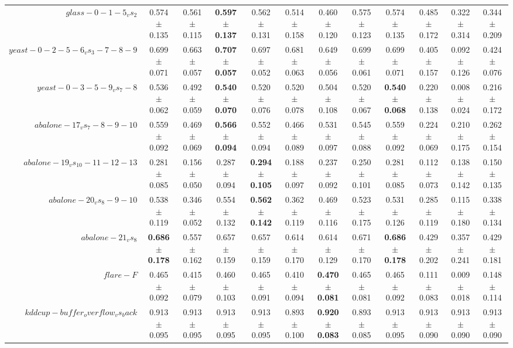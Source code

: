 \begin{table}[!ht]
{\begin{tabular}{r c c c c c c c c c c c}
$glass-0-1-5_vs_2$ & 0.574 $\pm$ 0.135 & 0.561 $\pm$ 0.115 & \textbf{0.597 $\pm$ 0.137} & 0.562 $\pm$ 0.131 & 0.514 $\pm$ 0.158 & 0.460 $\pm$ 0.120 & 0.575 $\pm$ 0.123 & 0.574 $\pm$ 0.135 & 0.485 $\pm$ 0.172 & 0.322 $\pm$ 0.314 & 0.344 $\pm$ 0.209 \\
$yeast-0-2-5-6_vs_3-7-8-9$ & 0.699 $\pm$ 0.071 & 0.663 $\pm$ 0.057 & \textbf{0.707 $\pm$ 0.057} & 0.697 $\pm$ 0.052 & 0.681 $\pm$ 0.063 & 0.649 $\pm$ 0.056 & 0.699 $\pm$ 0.061 & 0.699 $\pm$ 0.071 & 0.405 $\pm$ 0.157 & 0.092 $\pm$ 0.126 & 0.424 $\pm$ 0.076 \\
$yeast-0-3-5-9_vs_7-8$ & 0.536 $\pm$ 0.062 & 0.492 $\pm$ 0.059 & \textbf{0.540 $\pm$ 0.070} & 0.520 $\pm$ 0.076 & 0.520 $\pm$ 0.078 & 0.504 $\pm$ 0.108 & 0.520 $\pm$ 0.067 & \textbf{0.540 $\pm$ 0.068} & 0.220 $\pm$ 0.138 & 0.008 $\pm$ 0.024 & 0.216 $\pm$ 0.172 \\
$abalone-17_vs_7-8-9-10$ & 0.559 $\pm$ 0.092 & 0.469 $\pm$ 0.069 & \textbf{0.566 $\pm$ 0.094} & 0.552 $\pm$ 0.094 & 0.466 $\pm$ 0.089 & 0.531 $\pm$ 0.097 & 0.545 $\pm$ 0.088 & 0.559 $\pm$ 0.092 & 0.224 $\pm$ 0.069 & 0.210 $\pm$ 0.175 & 0.262 $\pm$ 0.154 \\
$abalone-19_vs_10-11-12-13$ & 0.281 $\pm$ 0.085 & 0.156 $\pm$ 0.050 & 0.287 $\pm$ 0.094 & \textbf{0.294 $\pm$ 0.105} & 0.188 $\pm$ 0.097 & 0.237 $\pm$ 0.092 & 0.250 $\pm$ 0.101 & 0.281 $\pm$ 0.085 & 0.112 $\pm$ 0.073 & 0.138 $\pm$ 0.142 & 0.150 $\pm$ 0.135 \\
$abalone-20_vs_8-9-10$ & 0.538 $\pm$ 0.119 & 0.346 $\pm$ 0.052 & 0.554 $\pm$ 0.132 & \textbf{0.562 $\pm$ 0.142} & 0.362 $\pm$ 0.119 & 0.469 $\pm$ 0.116 & 0.523 $\pm$ 0.175 & 0.531 $\pm$ 0.126 & 0.285 $\pm$ 0.119 & 0.115 $\pm$ 0.180 & 0.338 $\pm$ 0.134 \\
$abalone-21_vs_8$ & \textbf{0.686 $\pm$ 0.178} & 0.557 $\pm$ 0.162 & 0.657 $\pm$ 0.159 & 0.657 $\pm$ 0.159 & 0.614 $\pm$ 0.170 & 0.614 $\pm$ 0.129 & 0.671 $\pm$ 0.170 & \textbf{0.686 $\pm$ 0.178} & 0.429 $\pm$ 0.202 & 0.357 $\pm$ 0.241 & 0.429 $\pm$ 0.181 \\
$flare-F$ & 0.465 $\pm$ 0.092 & 0.415 $\pm$ 0.079 & 0.460 $\pm$ 0.103 & 0.465 $\pm$ 0.091 & 0.410 $\pm$ 0.094 & \textbf{0.470 $\pm$ 0.081} & 0.465 $\pm$ 0.081 & 0.465 $\pm$ 0.092 & 0.111 $\pm$ 0.083 & 0.009 $\pm$ 0.018 & 0.148 $\pm$ 0.114 \\
$kddcup-buffer_overflow_vs_back$ & 0.913 $\pm$ 0.095 & 0.913 $\pm$ 0.095 & 0.913 $\pm$ 0.095 & 0.913 $\pm$ 0.095 & 0.893 $\pm$ 0.100 & \textbf{0.920 $\pm$ 0.083} & 0.893 $\pm$ 0.085 & 0.913 $\pm$ 0.095 & 0.913 $\pm$ 0.090 & 0.913 $\pm$ 0.090 & 0.913 $\pm$ 0.090 \\

\end{tabular}}
\end{table}

